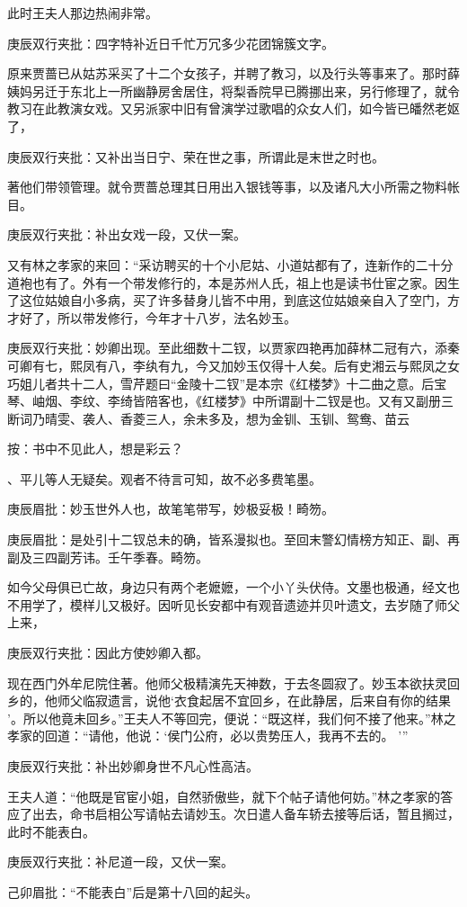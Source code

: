 \begin{parag}
    此时王夫人那边热闹非常。\begin{note}庚辰双行夹批：四字特补近日千忙万冗多少花团锦簇文字。\end{note}原来贾蔷已从姑苏采买了十二个女孩子，并聘了教习，以及行头等事来了。那时薛姨妈另迁于东北上一所幽静房舍居住，将梨香院早已腾挪出来，另行修理了，就令教习在此教演女戏。又另派家中旧有曾演学过歌唱的众女人们，如今皆已皤然老妪了，\begin{note}庚辰双行夹批：又补出当日宁、荣在世之事，所谓此是末世之时也。\end{note}著他们带领管理。就令贾蔷总理其日用出入银钱等事，以及诸凡大小所需之物料帐目。\begin{note}庚辰双行夹批：补出女戏一段，又伏一案。\end{note}又有林之孝家的来回：“采访聘买的十个小尼姑、小道姑都有了，连新作的二十分道袍也有了。外有一个带发修行的，本是苏州人氏，祖上也是读书仕宦之家。因生了这位姑娘自小多病，买了许多替身儿皆不中用，到底这位姑娘亲自入了空门，方才好了，所以带发修行，今年才十八岁，法名妙玉。\begin{note}庚辰双行夹批：妙卿出现。至此细数十二钗，以贾家四艳再加薛林二冠有六，添秦可卿有七，熙凤有八，李纨有九，今又加妙玉仅得十人矣。后有史湘云与熙凤之女巧姐儿者共十二人，雪芹题曰“金陵十二钗”是本宗《红楼梦》十二曲之意。后宝琴、岫烟、李纹、李绮皆陪客也，《红楼梦》中所谓副十二钗是也。又有又副册三断词乃晴雯、袭人、香菱三人，余未多及，想为金钏、玉钏、鸳鸯、苗云\begin{subnote}按：书中不见此人，想是彩云？\end{subnote}、平儿等人无疑矣。观者不待言可知，故不必多费笔墨。\end{note}\begin{note}庚辰眉批：妙玉世外人也，故笔笔带写，妙极妥极！畸笏。\end{note}\begin{note}庚辰眉批：是处引十二钗总未的确，皆系漫拟也。至回末警幻情榜方知正、副、再副及三四副芳讳。壬午季春。畸笏。\end{note}如今父母俱已亡故，身边只有两个老嬷嬷，一个小丫头伏侍。文墨也极通，经文也不用学了，模样儿又极好。因听见长安都中有观音遗迹并贝叶遗文，去岁随了师父上来，\begin{note}庚辰双行夹批：因此方使妙卿入都。\end{note}现在西门外牟尼院住著。他师父极精演先天神数，于去冬圆寂了。妙玉本欲扶灵回乡的，他师父临寂遗言，说他‘衣食起居不宜回乡，在此静居，后来自有你的结果 ’。所以他竟未回乡。”王夫人不等回完，便说：“既这样，我们何不接了他来。”林之孝家的回道：“请他，他说：‘侯门公府，必以贵势压人，我再不去的。 ’”\begin{note}庚辰双行夹批：补出妙卿身世不凡心性高洁。\end{note}王夫人道：“他既是官宦小姐，自然骄傲些，就下个帖子请他何妨。”林之孝家的答应了出去，命书启相公写请帖去请妙玉。次日遣人备车轿去接等后话，暂且搁过，此时不能表白。\begin{note}庚辰双行夹批：补尼道一段，又伏一案。\end{note}\begin{note}己卯眉批：“不能表白”后是第十八回的起头。\end{note}
\end{parag}


